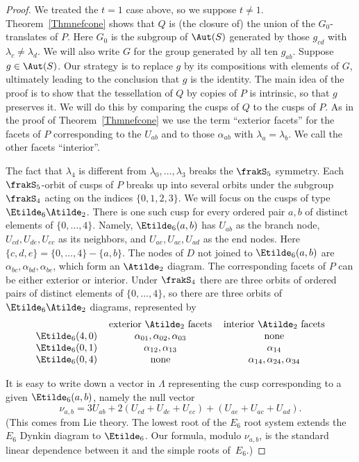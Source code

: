 \begin{proof}
We treated the $t=1$ case above, so we suppose $t\neq1$. Theorem~\ref{Thmnefcone} shows that $Q$ is (the closure of) the union of the $G_0$-translates of $P$. Here $G_0$ is the subgroup of $\Aut(S)$ generated by those $g_{cd}$ with $\lambda_c\neq\lambda_d$. We will also write $G$ for the group generated by all ten $g_{ab}$. Suppose $g\in\Aut(S)$. Our strategy is to replace $g$ by its compositions with elements of $G$, ultimately leading to the conclusion that $g$ is the identity. The main idea of the proof is to show that the tessellation of $Q$ by copies of $P$ is intrinsic, so that $g$ preserves it. We will do this by comparing the cusps of $Q$ to the cusps of $P$. As in the proof of Theorem~\ref{Thmnefcone} we use the term ``exterior facets'' for the facets of $P$ corresponding to the $U_{ab}$ and to those $\alpha_{ab}$ with $\lambda_a=\lambda_b$. We call the other facets ``interior''.

The fact that $\lambda_4$ is different from $\lambda_0,\dots,\lambda_3$ breaks the $\frakS_5$ symmetry. Each $\frakS_5$-orbit of cusps of $P$ breaks up into several orbits under the subgroup $\frakS_4$ acting on the indices $\{0,1,2,3\}$. We will focus on the cusps of type $\Etilde_6\Atilde_2$. There is one such cusp for every ordered pair $a,b$ of distinct elements of $\{0,\dots,4\}$. Namely, $\Etilde_6(a,b)$ has $U_{ab}$ as the branch node, $U_{cd},U_{de},U_{ec}$ as its neighbors, and $U_{ae},U_{ac},U_{ad}$ as the end nodes. Here $\{c,d,e\}=\{0,\dots,4\}-\{a,b\}$. The nodes of $D$ not joined to $\Etilde_6(a,b)$ are $\alpha_{bc},\alpha_{bd},\alpha_{be}$, which form an $\Atilde_2$ diagram. The corresponding facets of $P$ can be either exterior or interior. Under $\frakS_4$ there are three orbits of ordered pairs of distinct elements of $\{0,\dots,4\}$, so there are three orbits of $\Etilde_6\Atilde_2$ diagrams, represented by
\[
\begin{tabular}{ccc}
&exterior $\Atilde_2$ facets&interior $\Atilde_2$ facets
\\
$\Etilde_6(4,0)$&$\alpha_{01},\alpha_{02},\alpha_{03}$&none
\\
$\Etilde_6(0,1)$&$\alpha_{12},\alpha_{13}$&$\alpha_{14}$
\\
$\Etilde_6(0,4)$&none&$\alpha_{14},\alpha_{24},\alpha_{34}$
\end{tabular}
\] %

It is easy to write down a vector in $\Lambda$ representing the cusp corresponding to a given $\Etilde_6(a,b)$, namely the null vector
\begin{equation}\label{EqCusp}
\nu_{a,b}= 3 U_{ab} + 2(U_{cd}+U_{de}+U_{ec})+(U_{ae}+U_{ac}+U_{ad}).
\end{equation}
(This comes from Lie theory. The lowest root of the $E_6$ root system extends the $E_6$ Dynkin diagram to $\Etilde_6$. Our formula, modulo $\nu_{a,b}$, is the standard linear dependence between it and the simple roots of~$E_6$.)


\end{proof}
